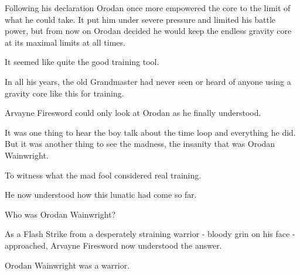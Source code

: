 \documentclass[a4paper,10pt]{book}
\begin{document}
Following his declaration Orodan once more empowered the core to the limit of what he could take. It put him under severe pressure and limited his battle power, but from now on Orodan decided he would keep the endless gravity core at its maximal limits at all times.\par
It seemed like quite the good training tool.\par
In all his years, the old Grandmaster had never seen or heard of anyone using a gravity core like this for training.\par
Arvayne Firesword could only look at Orodan as he finally understood.\par
It was one thing to hear the boy talk about the time loop and everything he did. But it was another thing to see the madness, the insanity that was Orodan Wainwright.\par
To witness what the mad fool considered real training.\par
He now understood how this lunatic had come so far.\par
Who was Orodan Wainwright?\par
As a Flash Strike from a desperately straining warrior - bloody grin on his face - approached, Arvayne Firesword now understood the answer.\par
Orodan Wainwright was a warrior.\par
\end{document}
